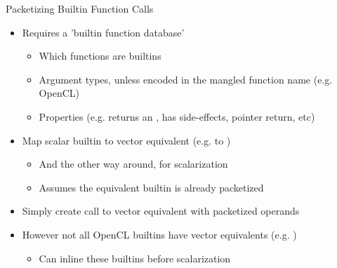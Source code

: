 \begin{frame}{Packetizing Builtin Function Calls}

\begin{itemize}
    \item Requires a 'builtin function database'
    \begin{itemize}
        \item Which functions are builtins
        \item Argument types, unless encoded in the mangled function name (e.g. OpenCL)
        \item Properties (e.g. returns an , has side-effects, pointer return, etc)
    \end{itemize}
    \item Map scalar builtin to vector equivalent (e.g.  to )
    \begin{itemize}
        \item And the other way around, for scalarization
        \item Assumes the equivalent builtin is already packetized
    \end{itemize}
    \item Simply create call to vector equivalent with packetized operands
    \item However not all OpenCL builtins have vector equivalents (e.g. )
    \begin{itemize}
        \item Can inline these builtins before scalarization
    \end{itemize}
\end{itemize}

\end{frame}


